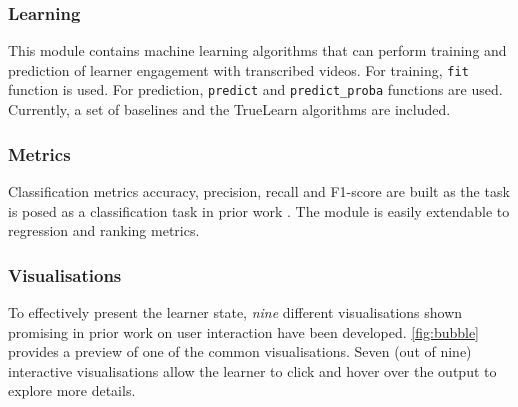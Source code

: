 \documentclass[letterpaper]{article} %
\begin{document}
\subsubsection{Learning}
This module contains machine learning algorithms that can perform training and prediction of learner engagement with transcribed videos. 
For training,  \texttt{fit} function is used. For prediction, \texttt{predict} and \texttt{predict\_proba} functions are used.
Currently, a set of baselines and the TrueLearn algorithms \cite{bulathwela2022sus} are included. 

\subsubsection{Metrics}
Classification metrics accuracy, precision, recall and F1-score are built as the task is posed as a classification task in prior work \cite{truelearn}. The module is easily extendable to regression and ranking metrics. 

\subsubsection{Visualisations}
To effectively present the learner state, \emph{nine} different visualisations shown promising in prior work on user interaction \cite{mti6060042} have been developed. 
\figurename{ \ref{fig:bubble}} provides a preview of one of the common visualisations. Seven (out of nine) interactive visualisations allow the learner to click and hover over the output to explore more details.
\end{document}
